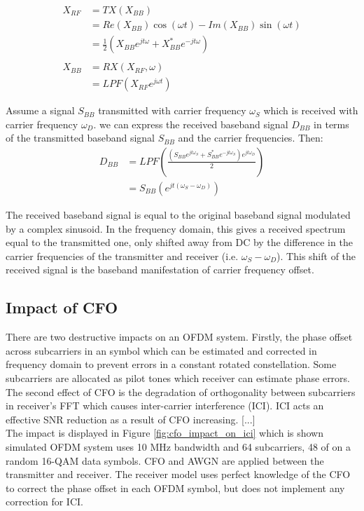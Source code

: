 \begin{equation}\label{eq_tx_rx_process}
\begin{split}
X_{RF} & = TX(X_{BB})\\
& = Re(X_{BB})\cos(\omega t) - Im(X_{BB})\sin(\omega t)\\
& = \frac{1}{2} (X_{BB} e^{jt\omega} + X^{*}_{BB} e^{-jt\omega})\\
\\
X_{BB} & = RX(X_{RF}, \omega)\\
& = LPF(X_{RF} e^{j\omega t})
\end{split}
\end{equation}


Assume a signal $S_{BB}$ transmitted with carrier frequency $\omega_{S}$ which is received with carrier frequency $\omega_{D}$. we can express the received baseband signal $D_{BB}$ in terms of the transmitted baseband signal $S_{BB}$ and the carrier frequencies. Then:\\

\begin{equation} \label{DBB_SBB}
\begin{split}
D_{BB} & = LPF(\frac{(S_{BB} e^{jt\omega_{S}} + S^{*}_{BB} e^{-jt\omega_{S}})e^{jt\omega_{D}}}{2})\\
&= S_{BB}(e^{jt(\omega_{S}- \omega_{D})})
\end{split}
\end{equation}

The received baseband signal is equal to the original baseband signal modulated by a complex sinusoid. In the frequency domain, this gives a received spectrum equal to the transmitted one, only shifted away from DC by the difference in the carrier frequencies of the transmitter and receiver (i.e. $\omega_{S}- \omega_{D}$). This shift of the received
signal is the baseband manifestation of carrier frequency offset.

\subsection{Impact of CFO}
\label{Impact_of_CFO}
There are two destructive impacts on an OFDM system. Firstly, the phase offset across subcarriers in an symbol which can be  estimated and corrected in frequency domain to prevent errors in a constant rotated constellation. Some subcarriers are allocated as pilot tones which receiver can estimate phase errors.\\
The second effect of CFO is the degradation of orthogonality between subcarriers in receiver's FFT which causes inter-carrier interference (ICI). ICI acts an effective SNR reduction as a result of CFO increasing. [...]\\
The impact is displayed in Figure \ref{fig:cfo_impact_on_ici} which is shown simulated OFDM system uses 10 MHz bandwidth and 64 subcarriers, 48 of on a random 16-QAM data symbols. CFO and AWGN are applied between the transmitter and receiver. The receiver model uses perfect knowledge of the CFO to correct the phase offset in each OFDM symbol, but does not implement any correction for ICI.\\

